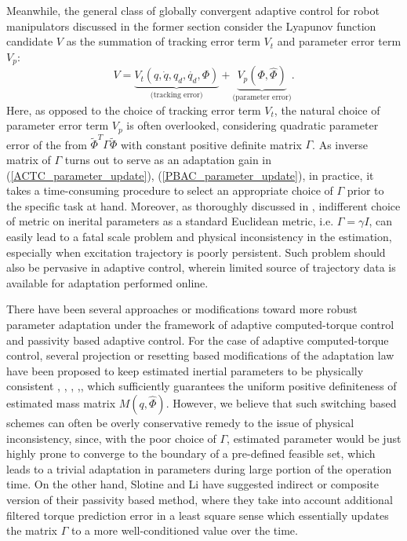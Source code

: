 \documentclass[letterpaper, 10 pt, conference]{ieeeconf}  %
\begin{document}
Meanwhile, the general class of globally convergent adaptive control for robot manipulators discussed in the former section consider the Lyapunov function candidate $V$ as the summation of tracking error term $V_t$ and parameter error term $V_p$:
\begin{equation}
V = \underbrace{V_t(q,\dot{q},q_{d},\dot{q_{d}},\Phi)}_{\text{(tracking error)}} + \underbrace{V_p(\Phi, \hat{\Phi})}_{\text{(parameter error)}}.
\end{equation}
Here, as opposed to the choice of tracking error term $V_{t}$, the natural choice of parameter error term $V_{p}$ is often overlooked, considering quadratic parameter error of the from $\tilde{\Phi}^{T}\Gamma\tilde{\Phi}$ with constant positive definite matrix $\Gamma$. As inverse matrix of $\Gamma$ turns out to serve as an adaptation gain in (\ref{ACTC_parameter_update}), (\ref{PBAC_parameter_update}), in practice, it takes a time-consuming procedure to select an appropriate choice of $\Gamma$ prior to the specific task at hand. Moreover, as thoroughly discussed in \cite{Taeyoon_RAL}, indifferent choice of metric on inerital parameters as a standard Euclidean metric, i.e. $\Gamma = \gamma I$, can easily lead to a fatal scale problem and physical inconsistency in the estimation, especially when excitation trajectory is poorly persistent. Such problem should also be pervasive in adaptive control, wherein limited source of trajectory data is available for adaptation performed online.

There have been several approaches or modifications toward more robust parameter adaptation under the framework of adaptive computed-torque control and passivity based adaptive control. For the case of adaptive computed-torque control, several projection or resetting based modifications of the adaptation law have been proposed to keep estimated inertial parameters to be physically consistent \cite{Craig_AdaptiveControl}, \cite{Slotine_Indirect}, \cite{Ioannou_RAC}, \cite{Wang_Projection},\cite{Goodwin_Projection}, which sufficiently guarantees the uniform positive definiteness of estimated mass matrix $M(q,\hat{\Phi})$. However, we believe that such switching based schemes can often be overly conservative remedy to the issue of physical inconsistency, since, with the poor choice of $\Gamma$, estimated parameter would be just highly prone to converge to the boundary of a pre-defined feasible set, which leads to a trivial adaptation in parameters during large portion of the operation time. On the other hand, Slotine and Li have suggested indirect \cite{Slotine_Indirect} or composite version \cite{Slotine_Composite} of their passivity based method, where they take into account additional filtered torque prediction error in a least square sense which essentially updates the matrix $\Gamma$ to a more well-conditioned value over the time.
\end{document}
